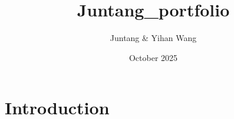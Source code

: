 \documentclass{article}
\title{Juntang_portfolio}
\author{Juntang & Yihan Wang}
\date{October 2025}
\begin{document}
\maketitle

\section{Introduction}
\end{document}
